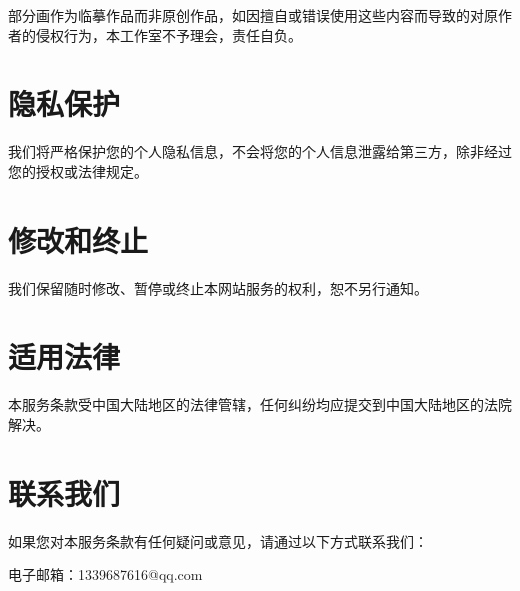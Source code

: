 \documentclass{article}
\begin{document}
部分画作为临摹作品而非原创作品，如因擅自或错误使用这些内容而导致的对原作者的侵权行为，本工作室不予理会，责任自负。

\section{隐私保护}

我们将严格保护您的个人隐私信息，不会将您的个人信息泄露给第三方，除非经过您的授权或法律规定。

\section{修改和终止}

我们保留随时修改、暂停或终止本网站服务的权利，恕不另行通知。

\section{适用法律}

本服务条款受中国大陆地区的法律管辖，任何纠纷均应提交到中国大陆地区的法院解决。

\section*{联系我们}

如果您对本服务条款有任何疑问或意见，请通过以下方式联系我们：

电子邮箱：1339687616@qq.com
\end{document}
